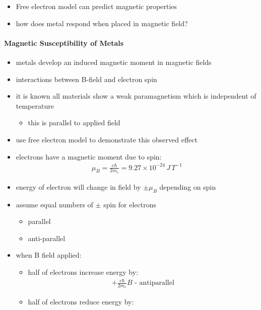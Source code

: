 \documentclass[a4paper,11pt,normalem]{article}
\begin{document}
\begin{itemize}
    \item Free electron model can predict magnetic properties
    \item how does metal respond when placed in magnetic field?
\end{itemize}

\paragraph{Magnetic Susceptibility of Metals}

\begin{itemize}
    \item metals develop an induced magnetic moment in magnetic fields
    \item interactions between B-field and electron spin
    \item it is known all materials show a weak paramagnetism which is independent of temperature
        \begin{itemize}
            \item this is parallel to applied field
        \end{itemize}
    \item use free electron model to demonstrate this observed effect
    \item electrons have a magnetic moment due to spin:
        \begin{align*}
            \mu_B = \frac{e\hbar}{2m_e} = 9.27\times10^{-24}\,J\,T^{-1}
        \end{align*}
    \item energy of electron will change in field by \(\pm \mu_B\) depending on spin
    \item assume equal numbers of \(\pm\) spin for electrons
        \begin{itemize}
            \item parallel
            \item anti-parallel
        \end{itemize}
    \item when B field applied:
        \begin{itemize}
            \item half of electrons increase energy by:
                \begin{align*}
                    + \frac{e\hbar}{2m_e}B \text{ - antiparallel}
                \end{align*}
            \item half of electrons reduce energy by:

\end{itemize}
\end{itemize}
\end{document}
